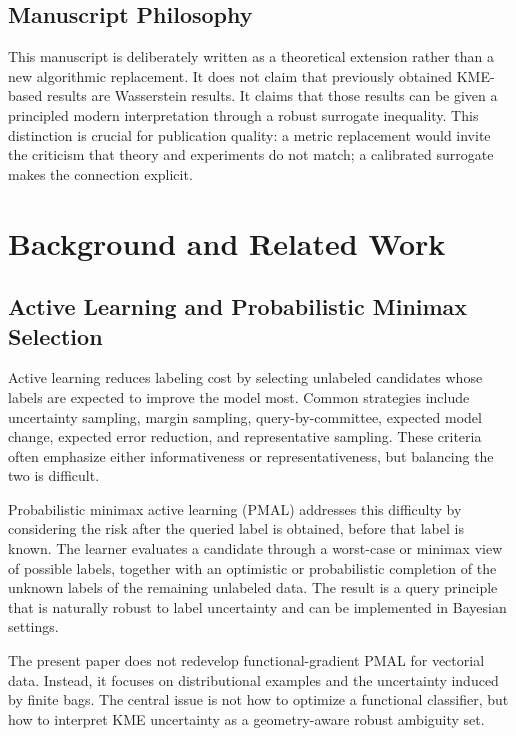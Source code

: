 \documentclass[10pt,journal]{IEEEtran}
\begin{document}
\subsection{Manuscript Philosophy}

This manuscript is deliberately written as a theoretical extension rather than a new algorithmic replacement. It does not claim that previously obtained KME-based results are Wasserstein results. It claims that those results can be given a principled modern interpretation through a robust surrogate inequality. This distinction is crucial for publication quality: a metric replacement would invite the criticism that theory and experiments do not match; a calibrated surrogate makes the connection explicit.

\section{Background and Related Work}
\label{sec:related}

\subsection{Active Learning and Probabilistic Minimax Selection}

Active learning reduces labeling cost by selecting unlabeled candidates whose labels are expected to improve the model most. Common strategies include uncertainty sampling, margin sampling, query-by-committee, expected model change, expected error reduction, and representative sampling. These criteria often emphasize either informativeness or representativeness, but balancing the two is difficult.

Probabilistic minimax active learning (PMAL) addresses this difficulty by considering the risk after the queried label is obtained, before that label is known. The learner evaluates a candidate through a worst-case or minimax view of possible labels, together with an optimistic or probabilistic completion of the unknown labels of the remaining unlabeled data. The result is a query principle that is naturally robust to label uncertainty and can be implemented in Bayesian settings.

The present paper does not redevelop functional-gradient PMAL for vectorial data. Instead, it focuses on distributional examples and the uncertainty induced by finite bags. The central issue is not how to optimize a functional classifier, but how to interpret KME uncertainty as a geometry-aware robust ambiguity set.
\end{document}
